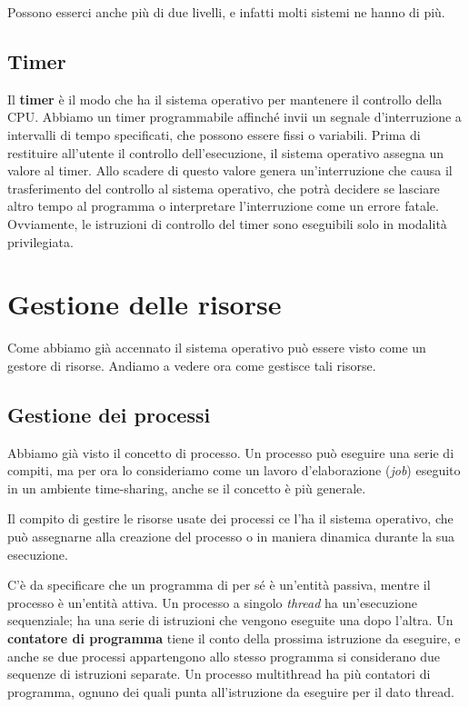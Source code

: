         Possono esserci anche più di due livelli, e infatti molti sistemi ne hanno di più.
                
    \subsection{Timer}
        Il \textbf{timer} è il modo che ha il sistema operativo per mantenere il controllo della CPU. Abbiamo un timer programmabile affinché invii un segnale d'interruzione a intervalli di tempo specificati, che possono essere fissi o variabili. Prima di restituire all'utente il controllo dell'esecuzione, il sistema operativo assegna un valore al timer. Allo scadere di questo valore genera un'interruzione che causa il trasferimento del controllo al sistema operativo, che potrà decidere se lasciare altro tempo al programma o interpretare l'interruzione come un errore fatale. Ovviamente, le istruzioni di controllo del timer sono eseguibili solo in modalità privilegiata.
                
\section{Gestione delle risorse}
    Come abbiamo già accennato il sistema operativo può essere visto come un gestore di risorse. Andiamo a vedere ora come gestisce tali risorse.
    
    \subsection{Gestione dei processi}
        Abbiamo già visto il concetto di processo. Un processo può eseguire una serie di compiti, ma per ora lo consideriamo come un lavoro d'elaborazione (\textit{job}) eseguito in un ambiente time-sharing, anche se il concetto è più generale.
        
        Il compito di gestire le risorse usate dei processi ce l'ha il sistema operativo, che può assegnarne alla creazione del processo o in maniera dinamica durante la sua esecuzione.
        
        C'è da specificare che un programma di per sé è un'entità passiva, mentre il processo è un'entità attiva. Un processo a singolo \textit{thread} ha un'esecuzione sequenziale; ha una serie di istruzioni che vengono eseguite una dopo l'altra. Un \textbf{contatore di programma} tiene il conto della prossima istruzione da eseguire, e anche se due processi appartengono allo stesso programma si considerano due sequenze di istruzioni separate. Un processo multithread ha più contatori di programma, ognuno dei quali punta all'istruzione da eseguire per il dato thread.
        
